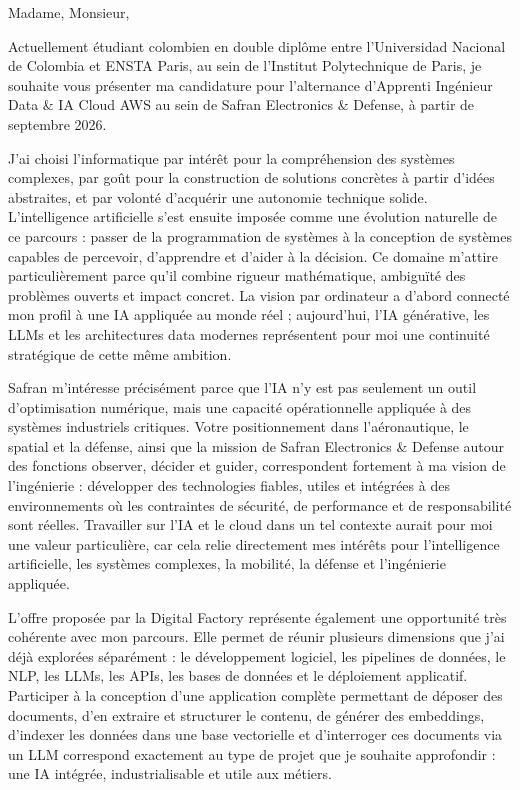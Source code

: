 \documentclass[10pt,a4paper]{article}
\begin{document}
{\small

Madame, Monsieur,

Actuellement étudiant colombien en double diplôme entre l’Universidad Nacional de Colombia et ENSTA Paris, au sein de l’Institut Polytechnique de Paris, je souhaite vous présenter ma candidature pour l’alternance d’Apprenti Ingénieur Data \& IA Cloud AWS au sein de Safran Electronics \& Defense, à partir de septembre 2026.

J’ai choisi l’informatique par intérêt pour la compréhension des systèmes complexes, par goût pour la construction de solutions concrètes à partir d’idées abstraites, et par volonté d’acquérir une autonomie technique solide. L’intelligence artificielle s’est ensuite imposée comme une évolution naturelle de ce parcours : passer de la programmation de systèmes à la conception de systèmes capables de percevoir, d’apprendre et d’aider à la décision. Ce domaine m’attire particulièrement parce qu’il combine rigueur mathématique, ambiguïté des problèmes ouverts et impact concret. La vision par ordinateur a d’abord connecté mon profil à une IA appliquée au monde réel ; aujourd’hui, l’IA générative, les LLMs et les architectures data modernes représentent pour moi une continuité stratégique de cette même ambition.

Safran m’intéresse précisément parce que l’IA n’y est pas seulement un outil d’optimisation numérique, mais une capacité opérationnelle appliquée à des systèmes industriels critiques. Votre positionnement dans l’aéronautique, le spatial et la défense, ainsi que la mission de Safran Electronics \& Defense autour des fonctions observer, décider et guider, correspondent fortement à ma vision de l’ingénierie : développer des technologies fiables, utiles et intégrées à des environnements où les contraintes de sécurité, de performance et de responsabilité sont réelles. Travailler sur l’IA et le cloud dans un tel contexte aurait pour moi une valeur particulière, car cela relie directement mes intérêts pour l’intelligence artificielle, les systèmes complexes, la mobilité, la défense et l’ingénierie appliquée.

L’offre proposée par la Digital Factory représente également une opportunité très cohérente avec mon parcours. Elle permet de réunir plusieurs dimensions que j’ai déjà explorées séparément : le développement logiciel, les pipelines de données, le NLP, les LLMs, les APIs, les bases de données et le déploiement applicatif. Participer à la conception d’une application complète permettant de déposer des documents, d’en extraire et structurer le contenu, de générer des embeddings, d’indexer les données dans une base vectorielle et d’interroger ces documents via un LLM correspond exactement au type de projet que je souhaite approfondir : une IA intégrée, industrialisable et utile aux métiers.

}
\end{document}

